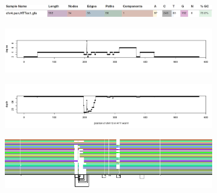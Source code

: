 \begin{figure}[h!]
	\begin{subfigure}{\linewidth}
		\caption{}
		\centering
		\includegraphics[width=1.0\linewidth, trim=-1.25cm 3cm 0 1.75cm]{fig/metrics/chr4_pan_HTTex1_gfa_multiqc_odgi_stats}
		\label{fig:metrics-multiqc}
	\end{subfigure}
	\begin{subfigure}{1\linewidth}
	\caption{}
	\centering
	\includegraphics[width=\linewidth,trim=+.225cm 3cm +.425cm +3cm]{fig/metrics/chr4_HTT_chm13_degree_w1_bed}
	\label{fig:metrics-degree}
	\end{subfigure}
	\begin{subfigure}{\linewidth}
	\caption{}
	\centering
	\includegraphics[width=\linewidth,trim=+.225cm 3cm +0.425cm +3cm]{fig/metrics/chr4_HTT_chm13_depth_w1_bed}
	\label{fig:metrics-depth}
	\end{subfigure}
	\begin{subfigure}{\linewidth}
		\caption{}
		\centering
		\includegraphics[width=1.0\linewidth, trim=-1.95cm 2cm -1.0cm 0.5cm]{fig/metrics/chr4_pan_fa_a2fb268_e820cd3_9ea71d8_smooth_gfa_og_HTTex1_og_O_og_tiny_og}
		\label{fig:metrics-viz}
	\end{subfigure}

\end{figure}
